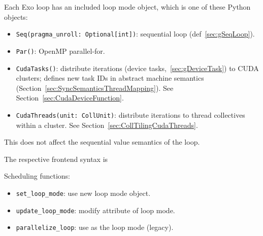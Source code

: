 
Each Exo loop has an included loop mode object, which is one of these Python objects:
\begin{itemize}
  \item \texttt{Seq(pragma\_unroll: Optional[int])}: sequential loop (def~\ref{sec:gSeqLoop}).
  \item \texttt{Par()}: OpenMP parallel-for.
  \item \texttt{CudaTasks()}: distribute iterations (device tasks,~\ref{sec:gDeviceTask}) to CUDA clusters; defines new task IDs in abstract machine semantics (Section~\ref{sec:SyncSemanticsThreadMapping}).
    See Section~\ref{sec:CudaDeviceFunction}.
  \item \texttt{CudaThreads(unit: CollUnit)}: distribute iterations to thread collectives within a cluster.
    See Section~\ref{sec:CollTilingCudaThreads}.
\end{itemize}
This does not affect the sequential value semantics of the loop.

The respective frontend syntax is



Scheduling functions:
\begin{itemize}
  \item \texttt{set\_loop\_mode}: use new loop mode object.
  \item \texttt{update\_loop\_mode}: modify attribute of loop mode.
  \item \texttt{parallelize\_loop}: use  as the loop mode (legacy).
\end{itemize}

